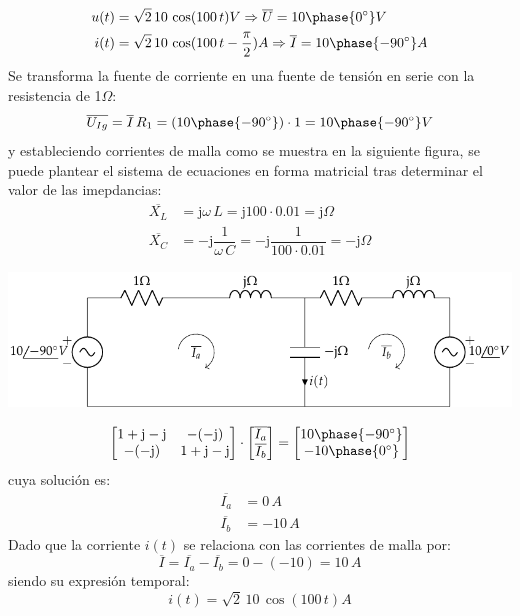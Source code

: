\begin{align*}
  u(t)&=\sqrt{2}\,10\,\cos(100\,t) V\Rightarrow \overline{U}=10\phase{\ang{0}} V\\
  i(t)&=\sqrt{2}\,10\,\cos(100\,t-\frac{\pi}{2}) A\Rightarrow \overline{I}=10\phase{\ang{-90}} A
\end{align*}
Se transforma la fuente de corriente en una fuente de tensión en serie
con la resistencia de 1$\Omega$:
\begin{equation*}
  \overline{U_{Ig}}=\overline{I}\, R_{1}=(10\phase{\ang{-90}})\cdot 1=10\phase{\ang{-90}} V
\end{equation*}
y estableciendo corrientes de malla como se muestra en la siguiente
figura, se puede plantear el sistema de ecuaciones en forma matricial
tras determinar el valor de las imepdancias:
\begin{align*}
  \overline{X_L}&=\mathrm{j}\omega\,L=\mathrm{j} 100\cdot 0.01= \mathrm{j}\Omega\\
  \overline{X_C}&=-\mathrm{j}\dfrac{1}{\omega\,C}=-\mathrm{j} \dfrac{1}{100\cdot 0.01}= -\mathrm{j}\Omega
\end{align*}

\begin{center}
  \includegraphics{figuras/BT2_13_mod.pdf}
\end{center}

\begin{equation*}
  \begin{bmatrix}
    1+\mathrm{j}-\mathrm{j} & -(-\mathrm{j})\\
    -(-\mathrm{j}) & 1+\mathrm{j}-\mathrm{j}
  \end{bmatrix}
  \cdot
  \begin{bmatrix}
    \overline{I_a}\\
    \overline{I_b}
  \end{bmatrix}
  =
  \begin{bmatrix}
    10\phase{-90^\circ}\\
    -10\phase{0^\circ}
  \end{bmatrix}
\end{equation*}
cuya solución es:
\begin{align*}
  \overline{I_a}&=0\,A\\
  \overline{I_b}&=-10\,A
\end{align*}
Dado que la corriente $i(t)$ se relaciona con las corrientes de malla
por:
\begin{equation*}
  \overline{I}=\overline{I_a}-\overline{I_b}=0-(-10)=10\,A
\end{equation*}
siendo su expresión temporal:
\begin{equation*}
  i(t)=\sqrt{2}\,10\,\cos(100\,t) A
\end{equation*}


